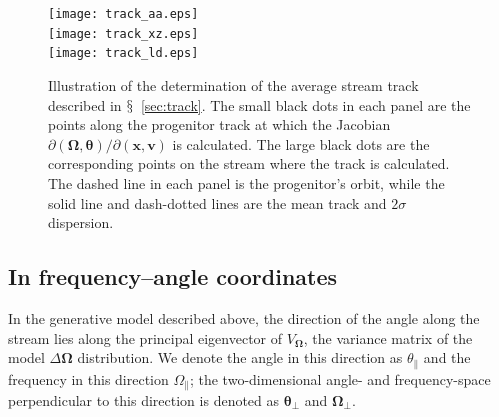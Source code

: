 \documentclass{emulateapj}
\newcommand{\sectionname}{$\mathsection$}
\renewcommand{\vec}[1]{\ensuremath{\mathbf{#1}}}
\newcommand{\vecx}{\ensuremath{\vec{x}}}
\newcommand{\vecv}{\ensuremath{\vec{v}}}
\newcommand{\veco}{\ensuremath{\vec{\Omega}}}
\newcommand{\veca}{\ensuremath{\boldsymbol\theta}}
\newcommand{\apar}{\ensuremath{\theta_\parallel}}
\newcommand{\opar}{\ensuremath{\Omega_\parallel}}
\newcommand{\aperp}{\ensuremath{\veca_\perp}}
\newcommand{\operp}{\ensuremath{\veco_\perp}}
\begin{document}
\begin{figure}[t!p]
\begin{center}
  \texttt{[image: track\_aa.eps]}\\
  \texttt{[image: track\_xz.eps]}\\
  \texttt{[image: track\_ld.eps]}
  \caption{Illustration of the determination of the average stream
    track described in \sectionname~\ref{sec:track}. The small black
    dots in each panel are the points along the progenitor track at
    which the Jacobian $\partial (\veco,\veca) / \partial
    (\vecx,\vecv)$ is calculated. The large black dots are the
    corresponding points on the stream where the track is
    calculated. The dashed line in each panel is the progenitor's
    orbit, while the solid line and dash-dotted lines are the mean
    track and $2\sigma$ dispersion.}\label{fig:track}
\end{center}
\end{figure}

\subsection{In frequency--angle coordinates}\label{sec:trackaa}

In the generative model described above, the direction of the angle
along the stream lies along the principal eigenvector of $V_\veco$,
the variance matrix of the model $\Delta \veco$ distribution. We
denote the angle in this direction as $\apar$ and the frequency in
this direction $\opar$; the two-dimensional angle- and frequency-space
perpendicular to this direction is denoted as $\aperp$ and $\operp$.
\end{document}
